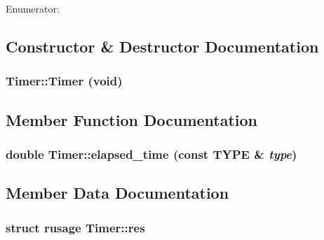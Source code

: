 \begin{Desc}
\item[Enumerator: ]\par
\begin{description}
\item[{\em 
\hypertarget{classTimer_f837f758756cde5bdb25c73253e3dd546040915dadd8d1a608e7472b47ebbc91}{
REAL}
\label{classTimer_f837f758756cde5bdb25c73253e3dd546040915dadd8d1a608e7472b47ebbc91}
}]\item[{\em 
\hypertarget{classTimer_f837f758756cde5bdb25c73253e3dd54e8780921637fe85eab01dda52d0fe2bc}{
VIRTUAL}
\label{classTimer_f837f758756cde5bdb25c73253e3dd54e8780921637fe85eab01dda52d0fe2bc}
}]\end{description}
\end{Desc}



\subsection{Constructor \& Destructor Documentation}
\hypertarget{classTimer_f866f8d58d5ed1da7a0c61df4975be3e}{
\subsubsection{\setlength{\rightskip}{0pt plus 5cm}Timer::Timer (void)}}
\label{classTimer_f866f8d58d5ed1da7a0c61df4975be3e}




\subsection{Member Function Documentation}
\hypertarget{classTimer_6ae79acba6fa12eb3c47ad135d4f5a03}{
\subsubsection{\setlength{\rightskip}{0pt plus 5cm}double Timer::elapsed\_\-time (const {\bf TYPE} \& {\em type})}}
\label{classTimer_6ae79acba6fa12eb3c47ad135d4f5a03}




\subsection{Member Data Documentation}
\hypertarget{classTimer_76c056e0461978783ca9c47af3d953d1}{
\subsubsection{\setlength{\rightskip}{0pt plus 5cm}struct rusage {\bf Timer::res}}}
\label{classTimer_76c056e0461978783ca9c47af3d953d1}


